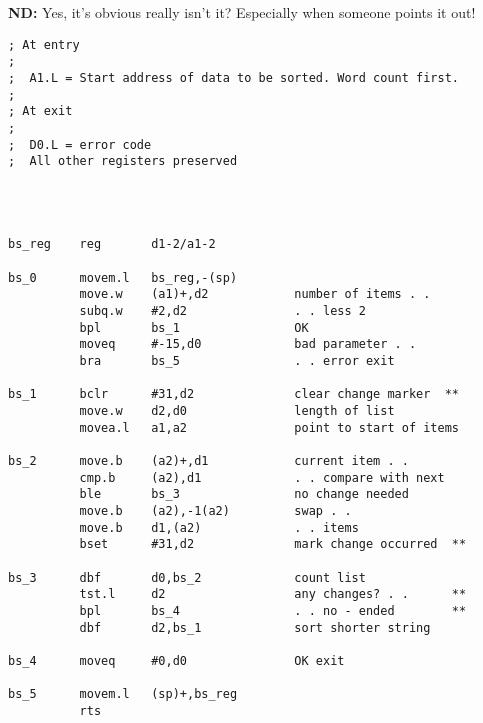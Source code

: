 \textbf{ND:} Yes, it's obvious really isn't it? Especially when someone points it out!


\begin{lstlisting}[firstnumber=1,caption={Even Better Bubblesort!}]
; At entry
;
;  A1.L = Start address of data to be sorted. Word count first.
;
; At exit
;
;  D0.L = error code
;  All other registers preserved




bs_reg    reg       d1-2/a1-2

bs_0      movem.l   bs_reg,-(sp)
          move.w    (a1)+,d2            number of items . .
          subq.w    #2,d2               . . less 2
          bpl       bs_1                OK
          moveq     #-15,d0             bad parameter . .
          bra       bs_5                . . error exit

bs_1      bclr      #31,d2              clear change marker  **
          move.w    d2,d0               length of list
          movea.l   a1,a2               point to start of items

bs_2      move.b    (a2)+,d1            current item . .
          cmp.b     (a2),d1             . . compare with next
          ble       bs_3                no change needed
          move.b    (a2),-1(a2)         swap . .
          move.b    d1,(a2)             . . items
          bset      #31,d2              mark change occurred  **

bs_3      dbf       d0,bs_2             count list
          tst.l     d2                  any changes? . .      **
          bpl       bs_4                . . no - ended        **
          dbf       d2,bs_1             sort shorter string

bs_4      moveq     #0,d0               OK exit

bs_5      movem.l   (sp)+,bs_reg
          rts
\end{lstlisting}
